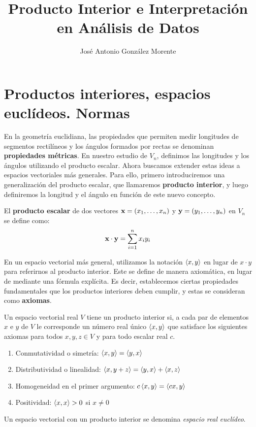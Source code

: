 \documentclass[a4paper,12pt]{article}
\title{\bfseries Producto Interior e Interpretación en Análisis de Datos}
\author{José Antonio González Morente}
\begin{document}
\maketitle

\begin{abstract}
\end{abstract}

\tableofcontents

\section{Productos interiores, espacios euclídeos. Normas}

En la geometría euclidiana, las propiedades que permiten medir longitudes de segmentos rectilíneos y los ángulos formados por rectas se denominan \textbf{propiedades métricas}. En nuestro estudio de $V_n$, definimos las longitudes y los ángulos utilizando el producto escalar. Ahora buscamos extender estas ideas a espacios vectoriales más generales. Para ello, primero introduciremos una generalización del producto escalar, que llamaremos \textbf{producto interior}, y luego definiremos la longitud y el ángulo en función de este nuevo concepto.

El \textbf{producto escalar} de dos vectores $\mathbf{x}=(x_1, \dots, x_n)$ y $\mathbf{y}=(y_1, \dots, y_n)$ en $V_n$ se define como:
\begin{equation}\label{eq:1}
    \mathbf{x} \cdot \mathbf{y} = \sum_{i=1}^n x_i y_i
\end{equation}

En un espacio vectorial más general, utilizamos la notación $\left\langle x,y\right\rangle$ en lugar de $x\cdot y$ para referirnos al producto interior. Este se define de manera axiomática, en lugar de mediante una fórmula explícita. Es decir, establecemos ciertas propiedades fundamentales que los productos interiores deben cumplir, y estas se consideran como \textbf{axiomas}.

\begin{df}
    Un espacio vectorial real $V$ tiene un producto interior si, a cada par de elementos $x$ e $y$ de $V$ le corresponde un número real único $\left\langle x,y\right\rangle$ que satisface los siguientes axiomas para todos $x,y,z \in V$ y para todo escalar real $c$.
    \begin{enumerate}
        \item Conmutatividad o simetría: $\left\langle x,y\right\rangle=\left\langle y,x\right\rangle$
        \item Distributividad o linealidad: $\left\langle x,y+z\right\rangle=\left\langle y,x\right\rangle+\left\langle x,z\right\rangle$
        \item Homogeneidad en el primer argumento: $c\left\langle x,y\right\rangle=\left\langle cx,y\right\rangle$
        \item Positividad: $\left\langle x,x\right\rangle>0$ si $x\neq 0$
    \end{enumerate}
    Un espacio vectorial con un producto interior se denomina {\it espacio real euclídeo}.
\end{df}
\end{document}
